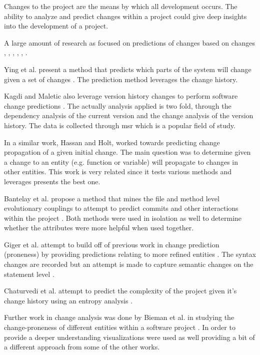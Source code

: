 Changes to the project are the means by which all development occurs. The ability to analyze and predict changes within a project could give deep insights into the development of a project.


A large amount of research as focused on predictions of changes based on changes \cite{Bantelay2013}, \cite{Chaturvedi2014}, \cite{Giger2012}, \cite{Hassan2004}, \cite{Kagdi2007}, \cite{Ying2004}. 

Ying et al. present a method that predicts which parts of the system will change given a set of changes \cite{Ying2004}. The prediction method leverages the change history.

Kagdi and Maletic also leverage version history changes to perform software change predictions \cite{Kagdi2007}. The actually analysis applied is two fold, through the dependency analysis of the current version and the change analysis of the version history. The data is collected through \gls{msr} which is a popular field of study. 

In a similar work, Hassan and Holt, worked towards predicting change propagation of a given initial change. \cite{Hassan2004} The main question was to determine given a change to an entity (e.g. function or variable) will propagate to changes in other entities. This work is very related since it tests various methods and leverages presents the best one.

Bantelay et al. propose a method that mines the file and method level evolutionary couplings to attempt to predict commits and other interactions within the project \cite{Bantelay2013}. Both methods were used in isolation as well to determine whether the attributes were more helpful when used together.

Giger et al. attempt to build off of previous work in change prediction (proneness) by providing predictions relating to more refined entities \cite{Giger2012}. The syntax changes are recorded but an attempt is made to capture semantic changes on the statement level \cite{Giger2012}.

Chaturvedi et al. attempt to predict the complexity of the project given it's change history using an entropy analysis \cite{Chaturvedi2014}.

Further work in change analysis was done by Bieman et al. in studying the change-proneness of different entities within a software project \cite{Bieman2003}. In order to provide a deeper understanding visualizations were used as well providing a bit of a different approach from some of the other works.

